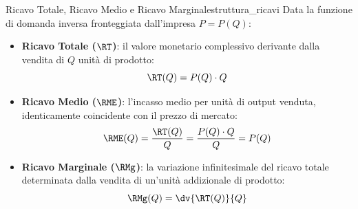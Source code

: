 \begin{definizione}{Ricavo Totale, Ricavo Medio e Ricavo Marginale}{struttura_ricavi}
Data la funzione di domanda inversa fronteggiata dall'impresa $P = P(Q)$:
\begin{itemize}
    \item \textbf{Ricavo Totale ($\RT$)}: il valore monetario complessivo derivante dalla vendita di $Q$ unità di prodotto:
    \begin{equation}
        \RT(Q) = P(Q) \cdot Q
    \end{equation}
    \item \textbf{Ricavo Medio ($\RME$)}: l'incasso medio per unità di output venduta, identicamente coincidente con il prezzo di mercato:
    \begin{equation}
        \RME(Q) = \frac{\RT(Q)}{Q} = \frac{P(Q) \cdot Q}{Q} = P(Q)
    \end{equation}
    \item \textbf{Ricavo Marginale ($\RMg$)}: la variazione infinitesimale del ricavo totale determinata dalla vendita di un'unità addizionale di prodotto:
    \begin{equation}
        \RMg(Q) = \dv{\RT(Q)}{Q}
    \end{equation}
\end{itemize}
\end{definizione}

